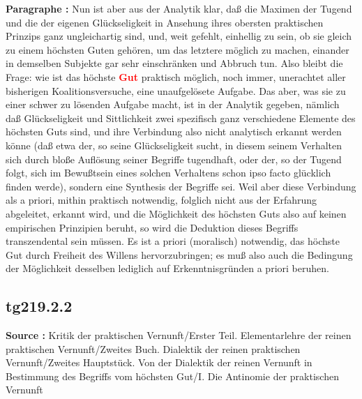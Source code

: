 \documentclass[a4paper,12pt,twoside]{book}
\newcommand{\match}[1]{\textcolor{red}{\textbf{#1}}}
\begin{document}
	\noindent\textbf{Paragraphe : }Nun ist aber aus der Analytik klar, daß die Maximen der Tugend und die der eigenen Glückseligkeit in Ansehung ihres obersten praktischen Prinzips ganz ungleichartig sind, und, weit gefehlt, einhellig zu sein, ob sie gleich zu einem höchsten Guten gehören, um das letztere möglich zu machen, einander in demselben Subjekte gar sehr einschränken und Abbruch tun. Also bleibt die Frage: wie ist das höchste \match{Gut} praktisch möglich, noch immer, unerachtet aller bisherigen Koalitionsversuche, eine unaufgelösete Aufgabe. Das aber, was sie zu einer schwer zu lösenden Aufgabe macht, ist in der Analytik gegeben, nämlich daß Glückseligkeit und Sittlichkeit zwei spezifisch ganz verschiedene Elemente des höchsten Guts sind, und ihre Verbindung also nicht analytisch erkannt werden könne (daß etwa der, so seine Glückseligkeit sucht, in diesem seinem Verhalten sich durch bloße Auflösung seiner Begriffe tugendhaft, oder der, so der Tugend folgt, sich im Bewußtsein eines solchen Verhaltens schon ipso facto glücklich finden werde), sondern eine Synthesis der Begriffe sei. Weil aber diese Verbindung als a priori, mithin praktisch notwendig, folglich nicht aus der Erfahrung abgeleitet, erkannt wird, und die Möglichkeit des höchsten Guts also auf keinen empirischen Prinzipien beruht, so wird die Deduktion dieses Begriffs transzendental sein müssen. Es ist a priori (moralisch) notwendig, das höchste Gut durch Freiheit des Willens hervorzubringen; es muß also auch die Bedingung der Möglichkeit desselben lediglich auf Erkenntnisgründen a priori beruhen. 
	
	\subsection*{tg219.2.2} 
	\textbf{Source : }Kritik der praktischen Vernunft/Erster Teil. Elementarlehre der reinen praktischen Vernunft/Zweites Buch. Dialektik der reinen praktischen Vernunft/Zweites Hauptstück. Von der Dialektik der reinen Vernunft in Bestimmung des Begriffs vom höchsten Gut/I. Die Antinomie der praktischen Vernunft\\  
	
\end{document}
